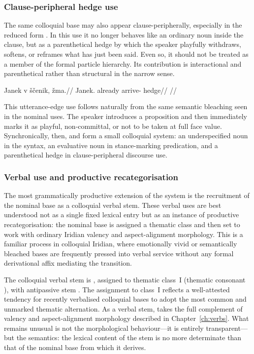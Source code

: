 \subsubsection{Clause-peripheral hedge use}

The same colloquial base may also appear clause-peripherally, especially in the
reduced form . In this use it no longer behaves like an ordinary noun
inside the clause, but as a parenthetical hedge by which the speaker playfully
withdraws, softens, or reframes what has just been said. Even so, it should not
be treated as a member of the formal particle hierarchy. Its contribution is
interactional and parenthetical rather than structural in the narrow sense.

\pex
\begingl
\gla Janek v ščenik, žma.//
\glb Janek.\Dir{} already arrive-\Pf{} hedge//
\glft {}//
\endgl
\xe

This utterance-edge use follows naturally from the same semantic bleaching seen
in the nominal uses. The speaker introduces a proposition and then immediately
marks it as playful, non-committal, or not to be taken at full face value.
Synchronically, then,  and  form a small colloquial system:
an underspecified noun in the syntax, an evaluative noun in stance-marking
predication, and a parenthetical hedge in clause-peripheral discourse use.

\subsubsection{Verbal use and productive
recategorisation}\label{sec:spoken-zema-verbal}

The most grammatically productive extension of the  system is the
recruitment of the nominal base as a colloquial verbal stem. These verbal uses
are best understood not as a single fixed lexical entry but as an instance of
productive recategorisation: the nominal base is assigned a thematic class and
then set to work with ordinary Iridian valency and aspect-alignment morphology.
This is a familiar process in colloquial Iridian, where emotionally vivid or
semantically bleached bases are frequently pressed into verbal service without
any formal derivational affix mediating the transition.

The colloquial verbal stem is , assigned to thematic class~I
(thematic consonant ), with antipassive stem . The
assignment to class~I reflects a well-attested tendency for recently verbalised
colloquial bases to adopt the most common and unmarked thematic alternation. As
a verbal stem,  takes the full complement of valency and
aspect-alignment morphology described in Chapter~\ref{ch:verbs}. What remains
unusual is not the morphological behaviour---it is entirely transparent---but
the semantics: the lexical content of the stem is no more determinate than that
of the nominal base from which it derives.

